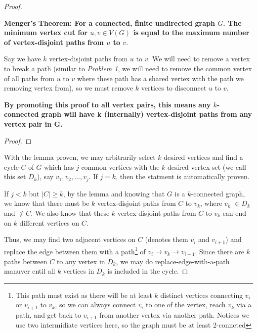 \documentclass[11pt]{article}
\begin{document}
\begin{proof}

\leavevmode\newline


    \begin{adjustwidth}{1cm}{}

    \textbf{Menger's Theorem: For a connected, finite undirected graph $G$. The minimum vertex cut for $u, v \in V(G)$ is equal to the maximum number of vertex-disjoint paths from $u$ to $v$}.\newline

    Say we have $k$ vertex-disjoint paths from $u$ to $v$. We will need to remove a vertex to break a path (similar to \textit{Problem 1}, we will need to remove the common vertex of all paths from $u$ to $v$ where these path has a shared vertex with the path we removing vertex from), so we must remove $k$ vertices to disconnect $u$ to $v$.

    \textbf{By promoting this proof to all vertex pairs, this means any $k$-connected graph will have k (internally) vertex-disjoint paths from any vertex pair in G.}

    \begin{proof}
    \end{proof}

    \end{adjustwidth}

With the lemma proven, we may arbitrarily select $k$ desired vertices and find a cycle $C$ of $G$ which has $j$ common vertices with the $k$ desired vertex set (we call this set $D_k$), say $v_1, v_2, ..., v_j$. If $j = k$, then the statment is automatically proven. \newline

If $j < k$ but $|C| \geq k$, by the lemma and knowing that $G$ is a $k$-connected graph, we know that there must be $k$ vertex-disjoint paths from $C$ to $v_k$, where $v_k$ $\in D_k$ and $\not \in C$. We also know that these $k$ vertex-disjoint paths from $C$ to $v_k$ can end on $k$ different vertices on $C$.

Thus, we may find two adjacent vertices on $C$ (denotes them $v_i$ and $v_{i+1}$) and replace the edge between them with a path\footnote{This path must exist as there will be at least $k$ distinct vertices connecting $v_{i}$ or $v_{i+1}$ to $v_k$, so we can always connect $v_i$ to one of the vertex, reach $v_k$ via a path, and get back to $v_{i+1}$ from another vertex via another path. Notices we use two intermidiate vertices here, so the graph must be at least 2-conncted} of $v_{i} \to v_k \to v_{i+1}$. Since there are $k$ paths between $C$ to any vertex in $D_k$, we may do replace-edge-with-a-path manuver entil all $k$ vertices in $D_k$ is included in the cycle.


\end{proof}
\end{document}
